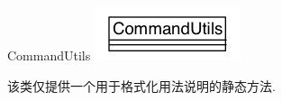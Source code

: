 \begin{XeClass}{CommandUtils}
\includegraphics[width=\textwidth]{cdig/CommandUtils.png}
     
 该类仅提供一个用于格式化用法说明的静态方法.

\end{XeClass}
